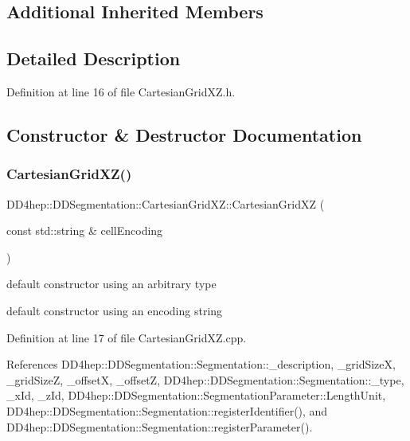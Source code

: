 \subsection*{Additional Inherited Members}


\subsection{Detailed Description}


Definition at line 16 of file Cartesian\+Grid\+X\+Z.\+h.



\subsection{Constructor \& Destructor Documentation}
\hypertarget{class_d_d4hep_1_1_d_d_segmentation_1_1_cartesian_grid_x_z_a30db21b84e994f6e735274ac33a2b6af}{}\label{class_d_d4hep_1_1_d_d_segmentation_1_1_cartesian_grid_x_z_a30db21b84e994f6e735274ac33a2b6af} 
\subsubsection{\texorpdfstring{Cartesian\+Grid\+X\+Z()}{CartesianGridXZ()}\hspace{0.1cm}{\footnotesize\ttfamily [1/2]}}
{\footnotesize\ttfamily D\+D4hep\+::\+D\+D\+Segmentation\+::\+Cartesian\+Grid\+X\+Z\+::\+Cartesian\+Grid\+XZ (\begin{DoxyParamCaption}\item[{const std\+::string \&}]{cell\+Encoding }\end{DoxyParamCaption})}



default constructor using an arbitrary type 

default constructor using an encoding string 

Definition at line 17 of file Cartesian\+Grid\+X\+Z.\+cpp.



References D\+D4hep\+::\+D\+D\+Segmentation\+::\+Segmentation\+::\+\_\+description, \+\_\+grid\+SizeX, \+\_\+grid\+SizeZ, \+\_\+offsetX, \+\_\+offsetZ, D\+D4hep\+::\+D\+D\+Segmentation\+::\+Segmentation\+::\+\_\+type, \+\_\+x\+Id, \+\_\+z\+Id, D\+D4hep\+::\+D\+D\+Segmentation\+::\+Segmentation\+Parameter\+::\+Length\+Unit, D\+D4hep\+::\+D\+D\+Segmentation\+::\+Segmentation\+::register\+Identifier(), and D\+D4hep\+::\+D\+D\+Segmentation\+::\+Segmentation\+::register\+Parameter().

